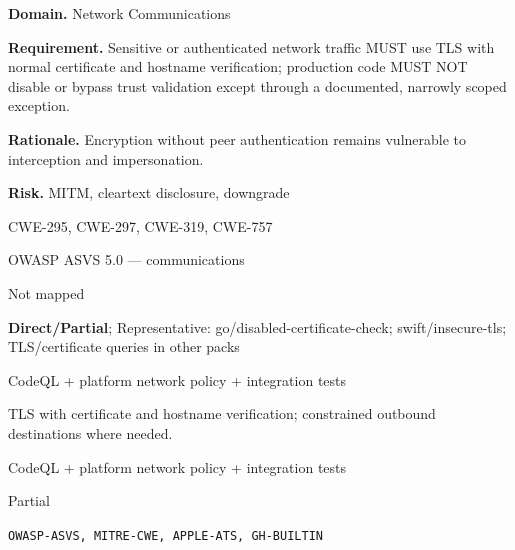 \documentclass[10pt,letterpaper]{article}
\newcommand{\prioritybadge}[2]{\tcbox[on line,boxrule=0pt,arc=1.2mm,boxsep=0.7mm,left=1mm,right=1mm,top=0.4mm,bottom=0.4mm,colback=#2!12,coltext=#2]{\scriptsize\bfseries #1}}
\begin{document}
\begin{rulebox}[title={\texttt{SCS-ALL-NET-001} \hfill \prioritybadge{Critical Control}{Critical}}]
\textbf{Domain.} Network Communications

\textbf{Requirement.} Sensitive or authenticated network traffic MUST use TLS with normal certificate and hostname verification; production code MUST NOT disable or bypass trust validation except through a documented, narrowly scoped exception.

\textbf{Rationale.} Encryption without peer authentication remains vulnerable to interception and impersonation.

\textbf{Risk.} MITM, cleartext disclosure, downgrade

\begin{description}[leftmargin=2.65cm,labelwidth=2.3cm,style=nextline,itemsep=1pt,topsep=3pt]
  \item[CWE] CWE-295, CWE-297, CWE-319, CWE-757
  \item[OWASP] OWASP ASVS 5.0 --- communications
  \item[CERT] Not mapped
  \item[CodeQL] \textbf{Direct/Partial}; Representative: go/disabled-certificate-check; swift/insecure-tls; TLS/certificate queries in other packs
  \item[Enforcement] CodeQL + platform network policy + integration tests
  \item[Prevention] TLS with certificate and hostname verification; constrained outbound destinations where needed.
  \item[Verification] CodeQL + platform network policy + integration tests
  \item[Automation] Partial
  \item[Sources] \texttt{OWASP-ASVS, MITRE-CWE, APPLE-ATS, GH-BUILTIN}
\end{description}
\end{rulebox}
\end{document}
